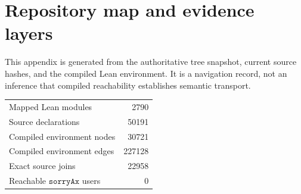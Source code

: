 \section{Repository map and evidence layers}
\label{sec:repository-map}
This appendix is generated from the authoritative tree snapshot, current source hashes, and the compiled Lean environment. It is a navigation record, not an inference that compiled reachability establishes semantic transport.
\begin{center}
\begin{tabular}{lr}
Mapped Lean modules & 2790\\
Source declarations & 50191\\
Compiled environment nodes & 30721\\
Compiled environment edges & 227128\\
Exact source joins & 22958\\
Reachable $\texttt{sorryAx}$ users & 0\\
\end{tabular}
\end{center}

